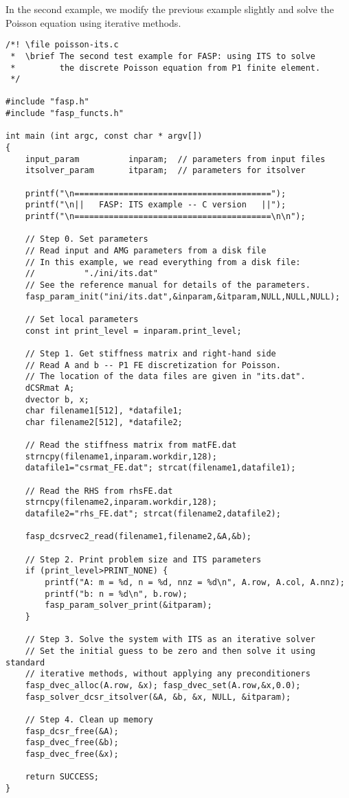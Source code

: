 \documentclass[11pt]{memoir}
\begin{document}
In the second example, we modify the previous example slightly and solve the Poisson equation using iterative methods. 

\begin{lstlisting}[stepnumber=1,firstnumber=1]
/*! \file poisson-its.c
 *  \brief The second test example for FASP: using ITS to solve 
 *         the discrete Poisson equation from P1 finite element.
 */

#include "fasp.h"
#include "fasp_functs.h"

int main (int argc, const char * argv[]) 
{
    input_param          inparam;  // parameters from input files
    itsolver_param       itparam;  // parameters for itsolver

    printf("\n========================================");
    printf("\n||   FASP: ITS example -- C version   ||");
    printf("\n========================================\n\n");
    
    // Step 0. Set parameters
    // Read input and AMG parameters from a disk file
    // In this example, we read everything from a disk file:
    //          "./ini/its.dat"
    // See the reference manual for details of the parameters. 
    fasp_param_init("ini/its.dat",&inparam,&itparam,NULL,NULL,NULL);

    // Set local parameters
    const int print_level = inparam.print_level;
    
    // Step 1. Get stiffness matrix and right-hand side
    // Read A and b -- P1 FE discretization for Poisson.
    // The location of the data files are given in "its.dat".
    dCSRmat A;
    dvector b, x;
    char filename1[512], *datafile1;
    char filename2[512], *datafile2;

    // Read the stiffness matrix from matFE.dat
    strncpy(filename1,inparam.workdir,128);    
    datafile1="csrmat_FE.dat"; strcat(filename1,datafile1);
    
    // Read the RHS from rhsFE.dat
    strncpy(filename2,inparam.workdir,128);
    datafile2="rhs_FE.dat"; strcat(filename2,datafile2);
    
    fasp_dcsrvec2_read(filename1,filename2,&A,&b);
    
    // Step 2. Print problem size and ITS parameters
    if (print_level>PRINT_NONE) {
        printf("A: m = %d, n = %d, nnz = %d\n", A.row, A.col, A.nnz);
        printf("b: n = %d\n", b.row);
        fasp_param_solver_print(&itparam);
    }
    
    // Step 3. Solve the system with ITS as an iterative solver
    // Set the initial guess to be zero and then solve it using standard
    // iterative methods, without applying any preconditioners
    fasp_dvec_alloc(A.row, &x); fasp_dvec_set(A.row,&x,0.0);
    fasp_solver_dcsr_itsolver(&A, &b, &x, NULL, &itparam);
    
    // Step 4. Clean up memory
    fasp_dcsr_free(&A);
    fasp_dvec_free(&b);
    fasp_dvec_free(&x);
    
    return SUCCESS;
}
\end{lstlisting}
\end{document}

